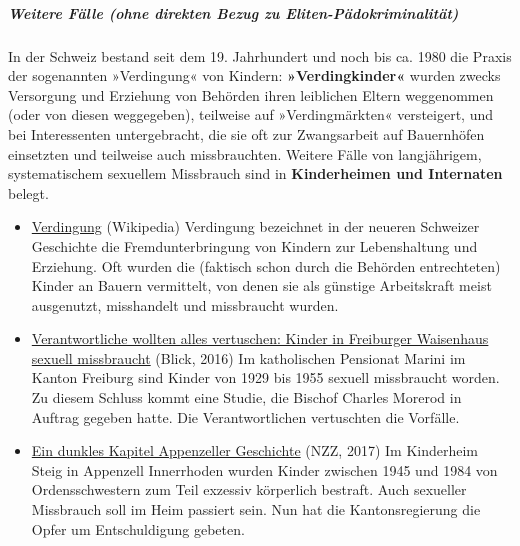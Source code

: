 \hypertarget{weitere-fuxe4lle-ohne-direkten-bezug-zu-eliten-puxe4dokriminalituxe4t}{%
\subparagraph{\texorpdfstring{\textbf{Weitere Fälle (ohne direkten Bezug
zu
Eliten-Pädokriminalität)}}{Weitere Fälle (ohne direkten Bezug zu Eliten-Pädokriminalität)}}\label{weitere-fuxe4lle-ohne-direkten-bezug-zu-eliten-puxe4dokriminalituxe4t}}

In der Schweiz bestand seit dem 19. Jahrhundert und noch bis ca. 1980
die Praxis der sogenannten »Verdingung« von Kindern:
\textbf{»Verdingkinder«} wurden zwecks Versorgung und Erziehung von
Behörden ihren leiblichen Eltern weggenommen (oder von diesen
weggegeben), teilweise auf »Verdingmärkten« versteigert, und bei
Interessenten untergebracht, die sie oft zur Zwangsarbeit auf
Bauernhöfen einsetzten und teilweise auch missbrauchten. Weitere Fälle
von langjährigem, systematischem sexuellem Missbrauch sind in
\textbf{Kinderheimen und Internaten} belegt.

\begin{itemize}
\tightlist
\item
  \href{https://de.wikipedia.org/wiki/Verdingung}{Verdingung}
  (Wikipedia) Verdingung bezeichnet in der neueren Schweizer Geschichte
  die Fremdunterbringung von Kindern zur Lebenshaltung und Erziehung.
  Oft wurden die (faktisch schon durch die Behörden entrechteten) Kinder
  an Bauern vermittelt, von denen sie als günstige Arbeitskraft meist
  ausgenutzt, misshandelt und missbraucht wurden.
\item
  \href{https://www.blick.ch/news/schweiz/westschweiz/verantwortliche-wollten-alles-vertuschen-kinder-in-freiburger-waisenhaus-sexuell-missbraucht-id4607199.html}{Verantwortliche
  wollten alles vertuschen: Kinder in Freiburger Waisenhaus sexuell
  missbraucht} (Blick, 2016) Im katholischen Pensionat Marini im Kanton
  Freiburg sind Kinder von 1929 bis 1955 sexuell missbraucht worden. Zu
  diesem Schluss kommt eine Studie, die Bischof Charles Morerod in
  Auftrag gegeben hatte. Die Verantwortlichen vertuschten die Vorfälle.
\item
  \href{https://www.nzz.ch/schweiz/zwangsmassnahmen-im-kinderheim-steig-ein-dunkles-kapitel-appenzeller-geschichte-ld.1304049}{Ein
  dunkles Kapitel Appenzeller Geschichte} (NZZ, 2017) Im Kinderheim
  Steig in Appenzell Innerrhoden wurden Kinder zwischen 1945 und 1984
  von Ordensschwestern zum Teil exzessiv körperlich bestraft. Auch
  sexueller Missbrauch soll im Heim passiert sein. Nun hat die
  Kantonsregierung die Opfer um Entschuldigung gebeten.
\end{itemize}

